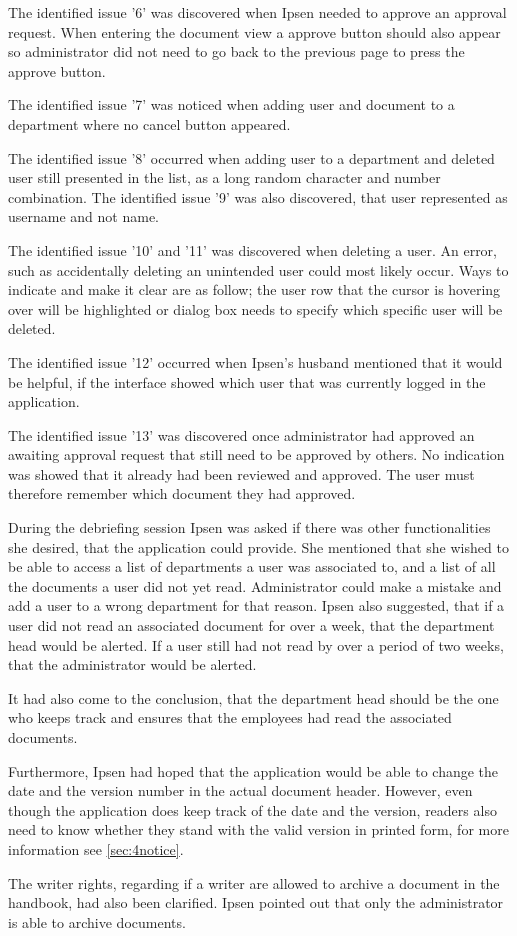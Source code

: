 \documentclass[../../master.tex]{subfiles}
\begin{document}
The identified issue '6' was discovered when Ipsen needed to approve an approval request.
When entering the document view a approve button should also appear so administrator did not need to go back to the previous page to press the approve button.

The identified issue '7' was noticed when adding user and document to a department where no cancel button appeared.

The identified issue '8' occurred when adding user to a department and deleted user still presented in the list, as a long random character and number combination.
The identified issue '9' was also discovered, that user represented as username and not name.

The identified issue '10'  and '11' was discovered when deleting a user.
An error, such as accidentally deleting an unintended user could most likely occur.
Ways to indicate and make it clear are as follow; the user row that the cursor is hovering over will be highlighted or dialog box needs to specify which specific user will be deleted.

The identified issue '12' occurred when Ipsen's husband mentioned that it would be helpful, if the interface showed which user that was currently logged in the application.

The identified issue '13' was discovered once administrator had approved an awaiting approval request that still need to be approved by others.
No indication was showed that it already had been reviewed and approved.
The user must therefore remember which document they had approved.


During the debriefing session Ipsen was asked if there was other functionalities she desired, that the application could provide.
She mentioned that she wished to be able to access a list of departments a user was associated to, and a list of all the documents a user did not yet read.
Administrator could make a mistake and add a user to a wrong department for that reason.
Ipsen also suggested, that if a user did not read an associated document for over a week, that the department head would be alerted.
If a user still had not read by over a period of two weeks, that the administrator would be alerted.

It had also come to the conclusion, that the department head should be the one who keeps track and ensures that the employees had read the associated documents.

Furthermore, Ipsen had hoped that the application would be able to change the date and the version number in the actual document header.
However, even though the application does keep track of the date and the version, readers also need to know whether they stand with the valid version in printed form, for more information see \cref{sec:4notice}.

The writer rights, regarding if a writer are allowed to archive a document in the handbook, had also been clarified.
Ipsen pointed out that only the administrator is able to archive documents.
\end{document}

